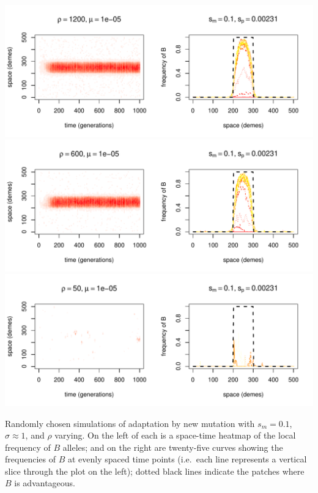 \documentclass{article}
\begin{document}

\begin{sfigure}
  \begin{center}
    \includegraphics{example-mutation-sims/18885-r1-501-sb0_01-sm-0_1-N1200-pophistory-run}
    \includegraphics{example-mutation-sims/56325-r1-501-sb0_01-sm-0_1-N600-pophistory-run}
    \includegraphics{example-mutation-sims/28432-r1-501-sb0_01-sm-0_1-N50-pophistory-run}
  \end{center}
  \caption{
    Randomly chosen simulations of adaptation by new mutation
    with $s_m=0.1$, $\sigma\approx 1$, and $\rho$ varying.
    On the left of each is a space-time heatmap of the local frequency of $B$ alleles;
    and on the right are twenty-five curves showing the frequencies of $B$ at evenly spaced time points
    (i.e.\ each line represents a vertical slice through the plot on the left);
    dotted black lines indicate the patches where $B$ is advantageous.
  } \label{sfig:sims_1}
\end{sfigure}
\end{document}
